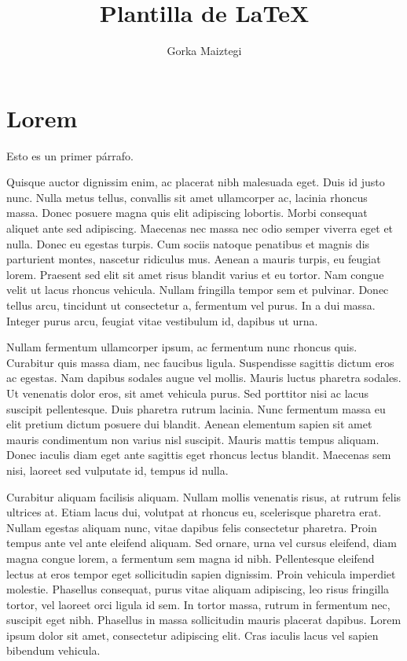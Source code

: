 \documentclass{ritsi/article}
\title{Plantilla de \LaTeX}
\author{Gorka Maiztegi}
\begin{document}
\section{Lorem}

Esto es un primer párrafo.

Quisque auctor dignissim enim, ac placerat nibh malesuada eget. Duis id justo nunc. Nulla metus tellus, convallis sit amet ullamcorper ac, lacinia rhoncus massa. Donec posuere magna quis elit adipiscing lobortis. Morbi consequat aliquet ante sed adipiscing. Maecenas nec massa nec odio semper viverra eget et nulla. Donec eu egestas turpis. Cum sociis natoque penatibus et magnis dis parturient montes, nascetur ridiculus mus. Aenean a mauris turpis, eu feugiat lorem. Praesent sed elit sit amet risus blandit varius et eu tortor. Nam congue velit ut lacus rhoncus vehicula. Nullam fringilla tempor sem et pulvinar. Donec tellus arcu, tincidunt ut consectetur a, fermentum vel purus. In a dui massa. Integer purus arcu, feugiat vitae vestibulum id, dapibus ut urna. 

Nullam fermentum ullamcorper ipsum, ac fermentum nunc rhoncus quis. Curabitur quis massa diam, nec faucibus ligula. Suspendisse sagittis dictum eros ac egestas. Nam dapibus sodales augue vel mollis. Mauris luctus pharetra sodales. Ut venenatis dolor eros, sit amet vehicula purus. Sed porttitor nisi ac lacus suscipit pellentesque. Duis pharetra rutrum lacinia. Nunc fermentum massa eu elit pretium dictum posuere dui blandit. Aenean elementum sapien sit amet mauris condimentum non varius nisl suscipit. Mauris mattis tempus aliquam. Donec iaculis diam eget ante sagittis eget rhoncus lectus blandit. Maecenas sem nisi, laoreet sed vulputate id, tempus id nulla. 

Curabitur aliquam facilisis aliquam. Nullam mollis venenatis risus, at rutrum felis ultrices at. Etiam lacus dui, volutpat at rhoncus eu, scelerisque pharetra erat. Nullam egestas aliquam nunc, vitae dapibus felis consectetur pharetra. Proin tempus ante vel ante eleifend aliquam. Sed ornare, urna vel cursus eleifend, diam magna congue lorem, a fermentum sem magna id nibh. Pellentesque eleifend lectus at eros tempor eget sollicitudin sapien dignissim. Proin vehicula imperdiet molestie. Phasellus consequat, purus vitae aliquam adipiscing, leo risus fringilla tortor, vel laoreet orci ligula id sem. In tortor massa, rutrum in fermentum nec, suscipit eget nibh. Phasellus in massa sollicitudin mauris placerat dapibus. Lorem ipsum dolor sit amet, consectetur adipiscing elit. Cras iaculis lacus vel sapien bibendum vehicula. 
\end{document}
